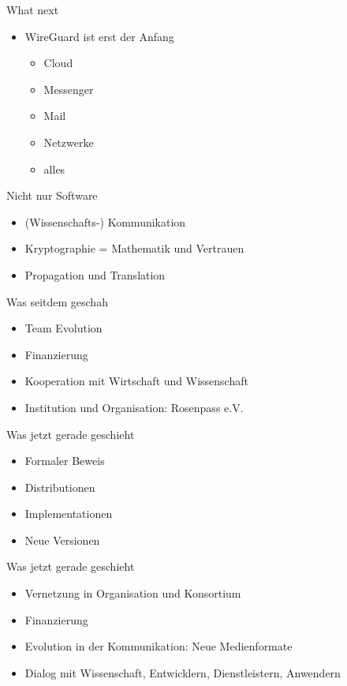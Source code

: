 \documentclass{rosenpass-beamer}
\begin{document}
	\begin{frame}{What next}
		\begin{itemize}
			\item WireGuard ist erst der Anfang
				\begin{itemize}
					\item Cloud
					\item Messenger
					\item Mail
					\item Netzwerke
					\item alles	
				\end{itemize}
		\end{itemize}
	\end{frame}	


	\begin{frame}{Nicht nur Software}
		\begin{itemize}
			\item (Wissenschafts-) Kommunikation
			\item Kryptographie = Mathematik und Vertrauen
			\item Propagation und Translation
		\end{itemize}
	\end{frame}	


	\begin{frame}{Was seitdem geschah}
		\begin{itemize}
			\item Team Evolution
			\item Finanzierung
			\item Kooperation mit Wirtschaft und Wissenschaft
			\item Institution und Organisation: Rosenpass e.V.
		\end{itemize}
	\end{frame}


	\begin{frame}{Was jetzt gerade geschieht}
		\begin{itemize}
			\item Formaler Beweis
			\item Distributionen
			\item Implementationen
			\item Neue Versionen
		\end{itemize}
	\end{frame}	


	\begin{frame}{Was jetzt gerade geschieht}
		\begin{itemize}
			\item Vernetzung in Organisation und Konsortium
			\item Finanzierung
			\item Evolution in der Kommunikation: Neue Medienformate
			\item Dialog mit Wissenschaft, Entwicklern, Dienstleistern, Anwendern
		\end{itemize}
	\end{frame}	
\end{document}
